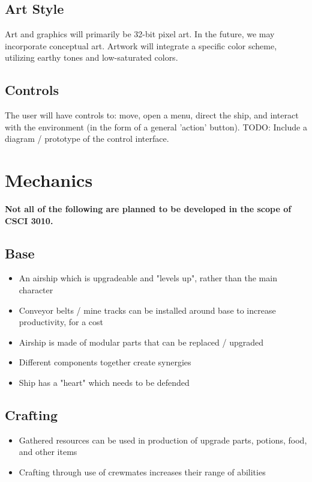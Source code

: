 \documentclass[a4paper]{scrreprt}
\begin{document}
\section{Art Style}
Art and graphics will primarily be 32-bit pixel art. In the future, we may incorporate conceptual art. Artwork will integrate a specific color scheme, utilizing earthy tones and low-saturated colors.

\section{Controls}
The user will have controls to: move, open a menu, direct the ship, and interact with the environment (in the form of a general 'action' button). TODO: Include a diagram / prototype of the control interface.



\chapter{Mechanics}
\textbf {Not all of the following are planned to be developed in the scope of CSCI 3010.}

\section{Base}
\begin{itemize}
\item An airship which is upgradeable and "levels up", rather than the main character
\item Conveyor belts / mine tracks can be installed around base to increase productivity, for a cost
\item Airship is made of modular parts that can be replaced / upgraded
\item Different components together create synergies
\item Ship has a "heart" which needs to be defended
\end{itemize}

\section{Crafting}
\begin{itemize}
\item Gathered resources can be used in production of upgrade parts, potions, food, and other items
\item Crafting through use of crewmates increases their range of abilities
\end{itemize}
\end{document}
